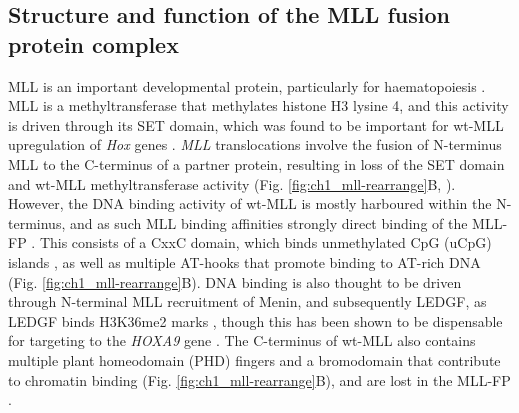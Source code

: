 \subsection{\label{ch1:mll-af4-function}Structure and function of the MLL fusion protein complex}

MLL is an important developmental protein, particularly for haematopoiesis \citep{mcmahon_mll_2007, crump_why_2019}. MLL is a methyltransferase that methylates histone H3 lysine 4, and this activity is driven through its SET domain, which was found to be important for wt-MLL upregulation of \textit{Hox} genes \citep{milne_mll_2002, nakamura_all-1_2002}. \textit{MLL} translocations involve the fusion of N-terminus MLL to the C-terminus of a partner protein, resulting in loss of the SET domain and wt-MLL methyltransferase activity (Fig. \ref{fig:ch1_mll-rearrange}B, \cite{winters_mll-rearranged_2017, zeleznik-le_11q23_1994}). However, the DNA binding activity of wt-MLL is mostly harboured within the N-terminus, and as such MLL binding affinities strongly direct binding of the MLL-FP \citep{winters_mll-rearranged_2017, zeleznik-le_11q23_1994}. This consists of a CxxC domain, which binds unmethylated CpG (uCpG) islands \citep{birke_mt_2002}, as well as multiple AT-hooks that promote binding to AT-rich DNA \citep{zeleznik-le_11q23_1994} (Fig. \ref{fig:ch1_mll-rearrange}B). DNA binding is also thought to be driven through N-terminal MLL recruitment of Menin, and subsequently LEDGF, as LEDGF binds H3K36me2 marks \citep{hughes_menin_2004, milne_menin_2005, yokoyama_menin_2008, zhu_ash1l_2016}, though this has been shown to be dispensable for targeting to the \textit{HOXA9} gene \citep{milne_multiple_2010}. The C-terminus of wt-MLL also contains multiple plant homeodomain (PHD) fingers and a bromodomain that contribute to chromatin binding (Fig. \ref{fig:ch1_mll-rearrange}B), and are lost in the MLL-FP \citep{zeleznik-le_11q23_1994}.

